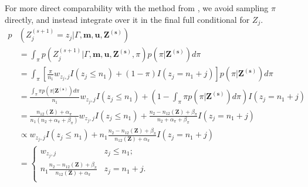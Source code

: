 \documentclass[ba]{imsart}
\begin{document}
For more direct comparability with the method from \cite{sadinle_bayesian_2017}, we avoid sampling $\pi$ directly, and instead integrate over it in the final full conditional for $Z_j$.
\begin{align*}
	p&\left(Z_j^{(s+1)}  = z_j| \Gamma, \bm{m}, \bm{u}, \bm{Z^{(s)}}\right)\\
	&= \int_{\pi}p\left(Z_j^{(s+1)} | \Gamma, \bm{m}, \bm{u}, \bm{Z^{(s)}}, \pi\right) p\left(\pi| \bm{Z^{(s)}}\right) d\pi \\
	&= \int_{\pi}\left[\frac{\pi}{n_1}w_{z_{j}, j} I(z_j\leq n_1) + (1-\pi)I(z_j = n_1 + j)\right] p\left(\pi| \bm{Z^{(s)}}\right) d\pi \\
	&= \frac{\int_{\pi} \pi p\left(\pi| \bm{Z^{(s)}}\right) d\pi}{n_1}w_{z_{j}, j} I(z_j\leq n_1) + \left(1-\int_{\pi} \pi p\left(\pi| \bm{Z^{(s)}}\right) d\pi \right) I(z_j = n_1 + j) \\
	&= \frac{n_{12}(\bm{Z}) + \alpha_{\pi}}{n_1 (n_2 + \alpha_{\pi} + \beta_{\pi})}w_{z_{j}, j} I(z_j\leq n_1) + \frac{n_2 - n_{12}(\bm{Z}) + \beta_{\pi}}{n_2 + \alpha_{\pi} + \beta_{\pi}}I(z_j = n_1 + j) \\
	&\propto w_{z_j, j}I(z_j\leq n_1) + n_1 \frac{n_2 - n_{12}(\bm{Z}) + \beta_{\pi}}{n_{12}(\bm{Z}) + \alpha_{\pi}}I(z_j = n_1 + j) \\
	&=
	\begin{cases} 
		w_{z_j, j}  & z_j \leq n_1; \\
		n_1 \frac{n_2 - n_{12}(\bm{Z}) + \beta_{\pi}}{n_{12}(\bm{Z}) + \alpha_{\pi}} & z_j   = n_1 + j. \\
	\end{cases} \\
\end{align*}

	\clearpage
	
\end{document}
